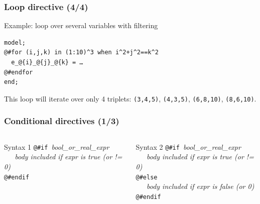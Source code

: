 \documentclass[aspectratio=169]{beamer}
\begin{document}
\begin{frame}[fragile=singleslide]
  \frametitle{Loop directive (4/4)}
  \begin{block}{Example: loop over several variables with filtering}
    \small
\begin{verbatim}
model;
@#for (i,j,k) in (1:10)^3 when i^2+j^2==k^2
  e_@{i}_@{j}_@{k} = …
@#endfor
end;
\end{verbatim}
    \normalsize
This loop will iterate over only 4 triplets: \texttt{(3,4,5)},
\texttt{(4,3,5)}, \texttt{(6,8,10)}, \texttt{(8,6,10)}.

  \end{block}
\end{frame}

\begin{frame}[fragile=singleslide]
  \frametitle{Conditional directives (1/3)}

  \begin{columns}[T]
    \begin{block}{Syntax 1}
\verb+@#if +\textit{bool\_or\_real\_expr} \\
\verb+   +\textit{body included if expr is true (or != 0)} \\
\verb+@#endif+
    \end{block}

    \begin{block}{Syntax 2}
\verb+@#if +\textit{bool\_or\_real\_expr} \\
\verb+   +\textit{body included if expr is true (or != 0)} \\
\verb+@#else+ \\
\verb+   +\textit{body included if expr is false (or 0)} \\
\verb+@#endif+
    \end{block}
  \end{columns}
\end{frame}
\end{document}
